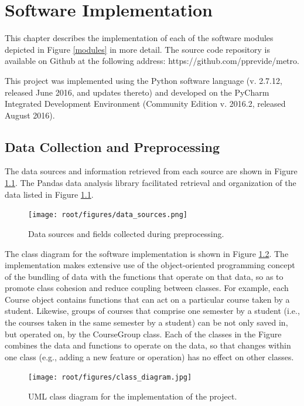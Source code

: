 \chapter{Software Implementation}
\label{chapter_implementation}

This chapter describes the implementation of each of the software modules depicted in Figure \ref{modules} in more detail.   The source code repository is available on Github at the following address:  https://github.com/pprevide/metro.

This project was implemented using the Python software language (v. 2.7.12, released June 2016, and updates thereto) and developed on the PyCharm Integrated Development Environment (Community Edition v. 2016.2, released August 2016).   

\section{Data Collection and Preprocessing}
\label{implementation_preprocessing}

The data sources and information retrieved from each source are shown in Figure \ref{data_sources}.  The Pandas data analysis library \cite{Pandas} facilitated retrieval and organization of the data listed in Figure \ref{data_sources}. 

\begin{figure}[htbp]
\centering
\texttt{[image: root/figures/data\_sources.png]}
\caption{Data sources and fields collected during preprocessing.}
\label{data_sources}
\end{figure}

The class diagram for the software implementation is shown in Figure \ref{class_diagram}.  The implementation makes extensive use of the object-oriented programming concept of the bundling of data with the functions that operate on that data, so as to promote class cohesion and reduce coupling between classes.  For example, each Course object contains functions that can act on a particular course taken by a student.  Likewise, groups of courses that comprise one semester by a student (i.e., the courses taken in the same semester by a student) can be not only saved in, but operated on, by the CourseGroup class.  Each of the classes in the Figure combines the data and functions to operate on the data, so that changes within one class (e.g., adding a new feature or operation) has no effect on other classes.  

\begin{figure}[htbp]
\centering 
\texttt{[image: root/figures/class\_diagram.jpg]}
\caption{UML class diagram for the implementation  of the project.}
\label{class_diagram}
\end{figure}

